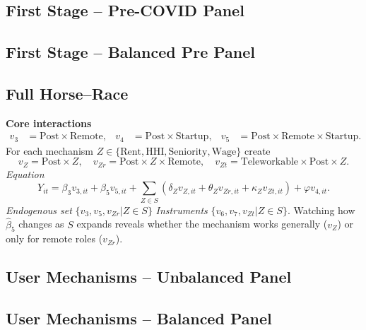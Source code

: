 \documentclass{article}
\newcommand{\cleanedresultsdir}{../../results/cleaned}
\begin{document}
\subsection{First Stage -- Pre-COVID Panel}

\subsection{First Stage -- Balanced Pre Panel}


\clearpage
\subsection*{Full Horse–Race}
\textbf{Core interactions}
\[\begin{aligned}
 v_3 &= \text{Post}\!\times\!\text{Remote}, &
 v_4 &= \text{Post}\!\times\!\text{Startup}, &
 v_5 &= \text{Post}\!\times\!\text{Remote}\!\times\!\text{Startup}. 
\end{aligned}\]
For each mechanism $Z\in\{\text{Rent},\text{HHI},\text{Seniority},\text{Wage}\}$ create
\[v_Z = \text{Post}\!\times\! Z,\quad v_{Zr}=\text{Post}\!\times\! Z\!\times\!\text{Remote},\quad v_{Zt}=\text{Teleworkable}\!\times\!\text{Post}\!\times\! Z.\]
\emph{Equation}
\[Y_{it}=\beta_3 v_{3,it}+\beta_5 v_{5,it}+\sum_{Z\in S}(\delta_Z v_{Z,it}+\theta_Z v_{Zr,it}+\kappa_Z v_{Zt,it})+\varphi v_{4,it}.
\]
\emph{Endogenous set}\; $\{v_3,v_5,v_{Zr}|Z\in S\}$ \quad\emph{Instruments}\; $\{v_6,v_7,v_{Zt}|Z\in S\}$.
Watching how $\widehat\beta_5$ changes as $S$ expands reveals whether the mechanism works generally ($v_Z$) or only for remote roles ($v_{Zr}$).


\clearpage
\begin{landscape}
\subsection{User Mechanisms -- Unbalanced Panel}

\end{landscape}

\begin{landscape}
\subsection{User Mechanisms -- Balanced Panel}

\end{landscape}
\end{document}

